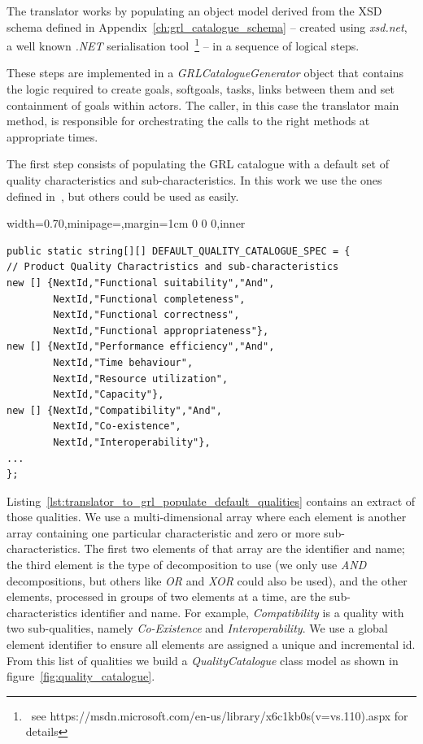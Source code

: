 \documentclass[dissertation,final]{softeng}
\newenvironment{featurecode}[1]
{ \lrbox\featurebox \begin{adjustbox}{width=#1\textwidth,minipage=\textwidth,margin=1cm 0 0 0,inner} }
{ \end{adjustbox}\endlrbox}
\newenvironment{featurelist}[2]
{
\newcommand{\setcaption}{\caption{#1}}
\newcommand{\setlabel}{\label{#2}}
}
{\begin{listing}[h!]\centering\usebox\featurebox\setcaption\setlabel\end{listing}}
\begin{document}
The translator works by populating an object model derived from the XSD schema defined in Appendix~\ref{ch:grl_catalogue_schema} -- created using \emph{xsd.net}, a well known \emph{.NET} serialisation tool~\footnote{~see https://msdn.microsoft.com/en-us/library/x6c1kb0s(v=vs.110).aspx for details} -- in a sequence of logical steps. 

These steps are implemented in a \emph{GRLCatalogueGenerator} object that contains the logic required to create goals, softgoals, tasks, links between them and set containment of goals within actors. The caller, in this case the translator main method, is responsible for orchestrating the calls to the right methods at appropriate times.

The first step consists of populating the GRL catalogue with a default set of quality characteristics and sub-characteristics. In this work we use the ones defined in~, but others could be used as easily.

\begin{featurelist}{Translator to GRL -- default quality set}{lst:translator_to_grl_populate_default_qualities}
\begin{featurecode}{0.70}
\begin{verbatim}
public static string[][] DEFAULT_QUALITY_CATALOGUE_SPEC = {
// Product Quality Charactristics and sub-characteristics
new [] {NextId,"Functional suitability","And", 
        NextId,"Functional completeness", 
        NextId,"Functional correctness", 
        NextId,"Functional appropriateness"},
new [] {NextId,"Performance efficiency","And", 
        NextId,"Time behaviour", 
        NextId,"Resource utilization", 
        NextId,"Capacity"},
new [] {NextId,"Compatibility","And", 
        NextId,"Co-existence", 
        NextId,"Interoperability"},
...
};       
\end{verbatim}
\end{featurecode}
\end{featurelist}

Listing~\ref{lst:translator_to_grl_populate_default_qualities} contains an extract of those qualities. We use a multi-dimensional array where each element is another array containing one particular characteristic and zero or more sub-characteristics. The first two elements of that array are the identifier and name; the third element is the type of decomposition to use (we only use \emph{AND} decompositions, but others like \emph{OR} and \emph{XOR} could also be used), and the other elements, processed in groups of two elements at a time, are the sub-characteristics identifier and name. For example, \emph{Compatibility} is a quality with two sub-qualities, namely \emph{Co-Existence} and \emph{Interoperability}. We use a global element identifier to ensure all elements are assigned a unique and incremental id. From this list of qualities we build a \emph{QualityCatalogue} class model as shown in figure~\ref{fig:quality_catalogue}.
\end{document}

